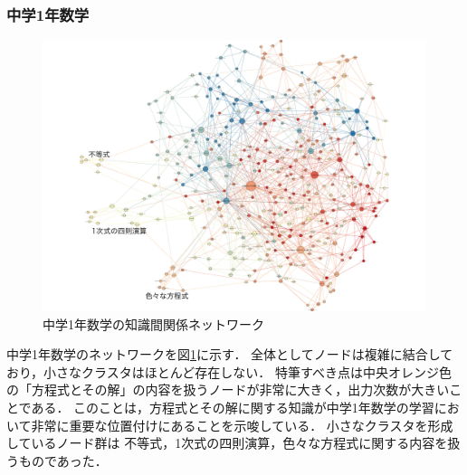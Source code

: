 \subsubsection{中学1年数学}
\begin{figure}[!htb]
\begin{center}
	\includegraphics[width=330pt]{./img/c1_mat_label2.pdf}
	\caption{中学1年数学の知識間関係ネットワーク}
	\label{fig:net_c1mat}
\end{center}
\end{figure}
中学1年数学のネットワークを図\ref{fig:net_c1mat}に示す．
全体としてノードは複雑に結合しており，小さなクラスタはほとんど存在しない．
特筆すべき点は中央オレンジ色の「方程式とその解」の内容を扱うノードが非常に大きく，出力次数が大きいことである．
このことは，方程式とその解に関する知識が中学1年数学の学習において非常に重要な位置付けにあることを示唆している．
小さなクラスタを形成しているノード群は
不等式，1次式の四則演算，色々な方程式に関する内容を扱うものであった．





